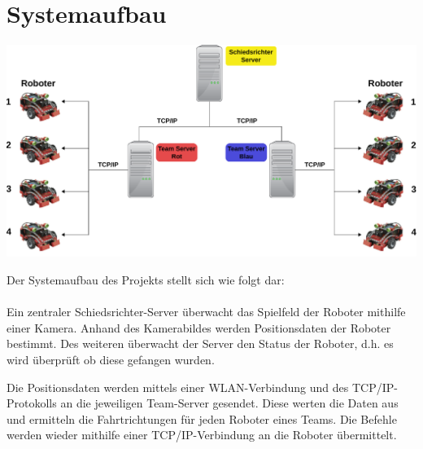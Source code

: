 \section{Systemaufbau}
\begin{center}
	\includegraphics[width=1\textwidth]{Bilder/Systemaufbau.pdf}
\end{center}
Der Systemaufbau des Projekts stellt sich wie folgt dar:
\\\\
Ein zentraler Schiedsrichter-Server überwacht das Spielfeld der Roboter mithilfe einer Kamera. Anhand des Kamerabildes werden Positionsdaten der Roboter bestimmt. Des weiteren überwacht der Server den Status der Roboter, d.h. es wird überprüft ob diese gefangen wurden.  

Die Positionsdaten werden mittels einer WLAN-Verbindung und des TCP/IP-Protokolls an die jeweiligen Team-Server gesendet. 
Diese werten die Daten aus und ermitteln die Fahrtrichtungen für jeden Roboter eines Teams. Die Befehle werden wieder mithilfe einer TCP/IP-Verbindung an die Roboter übermittelt.